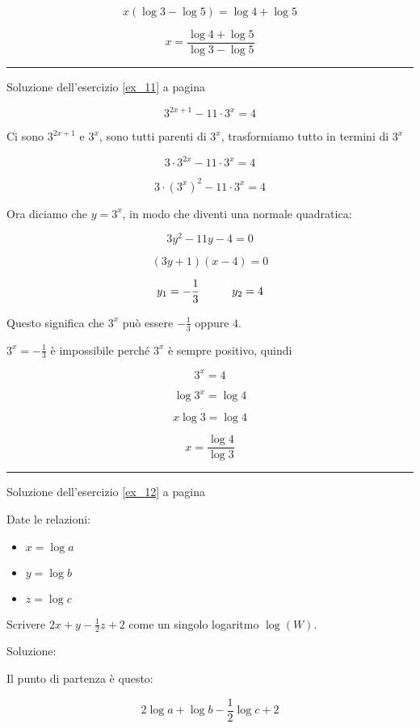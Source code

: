 \[
x(\log3-\log5)=\log4+\log5
\]

\[
x=\frac{
\log4+\log5
}{
\log3-\log5
}
\]



\vspace{1cm}
\hrule
\vspace{1cm}

Soluzione dell'esercizio \ref{ex_11} a pagina \pageref{ex_11}\label{sol_11}

\[
3^{2x+1}-11\cdot 3^x=4
\]


Ci sono $3^{2x+1}$ e $3^x$, sono tutti parenti di $3^x$, trasformiamo tutto in termini di $3^x$

\[
3\cdot 3^{2x}-11\cdot 3^x=4
\]

\[
3\cdot {\left(3^x\right)}^2-11\cdot 3^x=4
\]

Ora diciamo che $y=3^x$, in modo che diventi una normale quadratica:

\[
3y^2-11y-4=0
\]

\[
(3y+1)(x-4)=0
\]

\[
y_1=-\frac{1}{3}\textrm{\hspace{1cm}}y_2=4
\]

Questo significa che $3^x$ può essere $-\frac{1}{3}$ oppure $4$.

$3^x=-\frac{1}{3}$ è impossibile perché $3^x$ è sempre positivo, quindi

\[
3^x=4
\]

\[
\log3^x=\log4
\]

\[
x\log3=\log4
\]

\[
x=\frac{\log4}{\log3}
\]

\vspace{1cm}
\hrule
\vspace{1cm}

Soluzione dell'esercizio \ref{ex_12} a pagina \pageref{ex_12}\label{sol_12}

Date le relazioni:

\begin{itemize}
\item $x = \log a$
\item $y = \log b$
\item $z = \log c$
\end{itemize}

Scrivere $2x+y-\frac{1}{2}z+2$ come un singolo logaritmo $\log(W)$.

Soluzione:

Il punto di partenza è questo:

\[
2\log a+\log b-\frac{1}{2}\log c+2
\]

